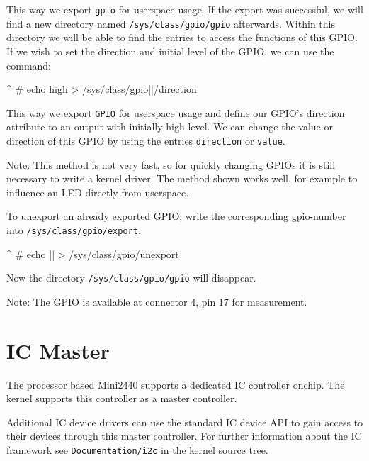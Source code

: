 This way we export \texttt{gpio\perGpioNumber{}} for userspace usage. If the
export was successful, we will find a new directory named
\texttt{/sys/class/gpio/gpio\perGpioNumber{}} afterwards. Within this directory
we will be able to find the entries to access the functions of this GPIO.
If we wish to set the direction and initial level of the GPIO, we can use the
command:

\begin{ptxshell}[escapechar=|]{^}
# echo high > /sys/class/gpio|\perGpioNumber |/direction|
\end{ptxshell}

This way we export \texttt{GPIO\perGpioNumber{}} for userspace usage and define
our GPIO's direction attribute to an output with initially high level. We can
change the value or direction of this GPIO by using the entries
\texttt{direction} or \texttt{value}.

Note: This method is not very fast, so for quickly changing GPIOs it is still
necessary to write a kernel driver. The method shown works well, for example to
influence an LED directly from userspace.

To unexport an already exported GPIO, write the corresponding gpio-number into
\texttt{/sys/class/gpio/export}.

\begin{ptxshell}[escapechar=|]{^}
# echo |\perGpioNumber | > /sys/class/gpio/unexport
\end{ptxshell}

Now the directory \texttt{/sys/class/gpio/gpio\perGpioNumber} will disappear.

Note: The GPIO\perGpioNumber{} is available at connector 4, pin 17 for
measurement.


\section{I\texttwosuperior C Master}			\label{sec:I2C}

The \perCpuName{} processor based Mini2440 supports a dedicated
I\texttwosuperior C controller onchip. The kernel supports this controller as a
master controller.

Additional I\texttwosuperior C device drivers can use the standard
I\texttwosuperior C device API to gain access to their devices through this
master controller.
For further information about the I\texttwosuperior C framework see
\texttt{Documentation/i2c} in the kernel source tree.

